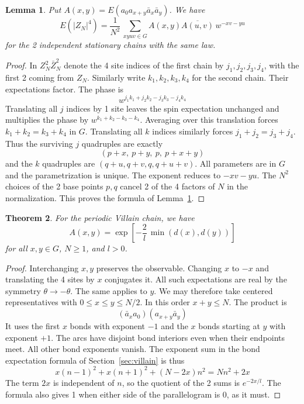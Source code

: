 \documentclass[11pt,a4paper]{article}
\newtheorem{thm}{Theorem}[section]
\newtheorem{lem}[thm]{Lemma}
\theoremstyle{remark}
\begin{document}
\begin{samepage}
\begin{lem}\label{lem:reduction}
Put $A(x,y)=E(a_0a_{x+y}\bar a_x\bar a_y)$. We have
\[
 E(|Z_N|^4)=\frac1{N^2}\,
   \sum_{xyuv\in G} A(x,y)\overline{A(u,v)}\,w^{-xv-yu}
\]
for the 2 independent stationary chains with the same law.
\end{lem}
\end{samepage}
\begin{proof}
In $Z_N^2\bar Z_N^2$ denote the 4 site indices of the first chain
by $j_1,j_2,j_3,j_4$, with the first 2 coming from $Z_N$. Similarly
write $k_1,k_2,k_3,k_4$ for the second chain. Their expectations factor.
The phase is
\[
 w^{j_1k_1+j_2k_2-j_3k_3-j_4k_4}
\]
Translating all $j$ indices by 1 site leaves the spin expectation
unchanged and multiplies the phase by $w^{k_1+k_2-k_3-k_4}$. Averaging
over this translation forces $k_1+k_2=k_3+k_4$ in $G$. Translating all
$k$ indices similarly forces $j_1+j_2=j_3+j_4$. Thus the surviving $j$
quadruples are exactly
\[
   (p+x,\ p+y,\ p,\ p+x+y)
\]
and the $k$ quadruples are $(q+u,q+v,q,q+u+v)$. All parameters are in $G$
and the parametrization is unique. The exponent reduces to $-xv-yu$.
The $N^2$ choices of the 2 base points $p,q$ cancel 2 of the 4
factors of $N$ in the normalization. This proves the formula of Lemma~\ref{lem:reduction}.
\end{proof}

\begin{samepage}
\begin{thm}\label{thm:para}
For the periodic Villain chain, we have
\[
  A(x,y)=\exp\!\left[-\frac2l\,\min(d(x),d(y))\right]
\]
for all $x,y\in G$, $N\ge1$, and $l>0$.
\end{thm}
\end{samepage}
\begin{proof}
Interchanging $x,y$ preserves the observable. Changing $x$ to $-x$ and
translating the 4 sites by $x$ conjugates it. All such expectations
are real by the symmetry $\theta\to-\theta$. The same applies to
$y$. We may therefore take centered representatives with
$0\le x\le y\le N/2$. In this order $x+y\le N$. The product is
\[
   (\bar a_x a_0)(a_{x+y}\bar a_y)
\]
It uses the first $x$ bonds with exponent $-1$ and the $x$ bonds starting
at $y$ with exponent $+1$. The arcs have disjoint bond interiors even when
their endpoints meet. All other bond exponents vanish. The exponent sum in
the bond expectation formula of Section~\ref{sec:villain} is thus
\[
   x(n-1)^2+x(n+1)^2+(N-2x)n^2=Nn^2+2x
\]
The term $2x$ is independent of $n$, so the quotient of the 2 sums is
$e^{-2x/l}$. The formula also gives 1 when either side of the
parallelogram is 0, as it must.
\end{proof}
\end{document}

